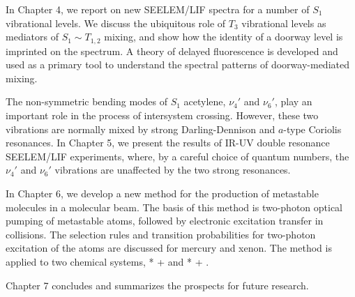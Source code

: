 In Chapter 4, we report on new SEELEM/LIF spectra for a number of
$S_1$ vibrational levels. We discuss the ubiquitous role of $T_3$
vibrational levels as mediators of $S_1 \sim T_{1,2}$ mixing, and show
how the identity of a doorway level is imprinted on the spectrum.  A
theory of delayed fluorescence is developed and used as a primary tool
to understand the spectral patterns of doorway-mediated mixing.



The non-symmetric bending modes of $S_1$ acetylene, $\nu_4'$ and
$\nu_6'$, play an important role in the process of intersystem
crossing.  However, these two vibrations are normally mixed by strong
Darling-Dennison and $a$-type Coriolis resonances.  In Chapter 5, we
present the results of IR-UV double resonance SEELEM/LIF experiments,
where, by a careful choice of quantum numbers, the $\nu_4'$ and
$\nu_6'$ vibrations are unaffected by the two strong resonances.

In Chapter 6, we develop a new method for the production of metastable
molecules in a molecular beam.  The basis of this method is two-photon
optical pumping of metastable atoms, followed by electronic excitation
transfer in collisions.  The selection rules and transition
probabilities for two-photon excitation of the atoms are discussed for
mercury and xenon.  The method is applied to two chemical systems,
* +  and * + .  


Chapter 7 concludes and summarizes the prospects for future research.

% 
% 
% 
